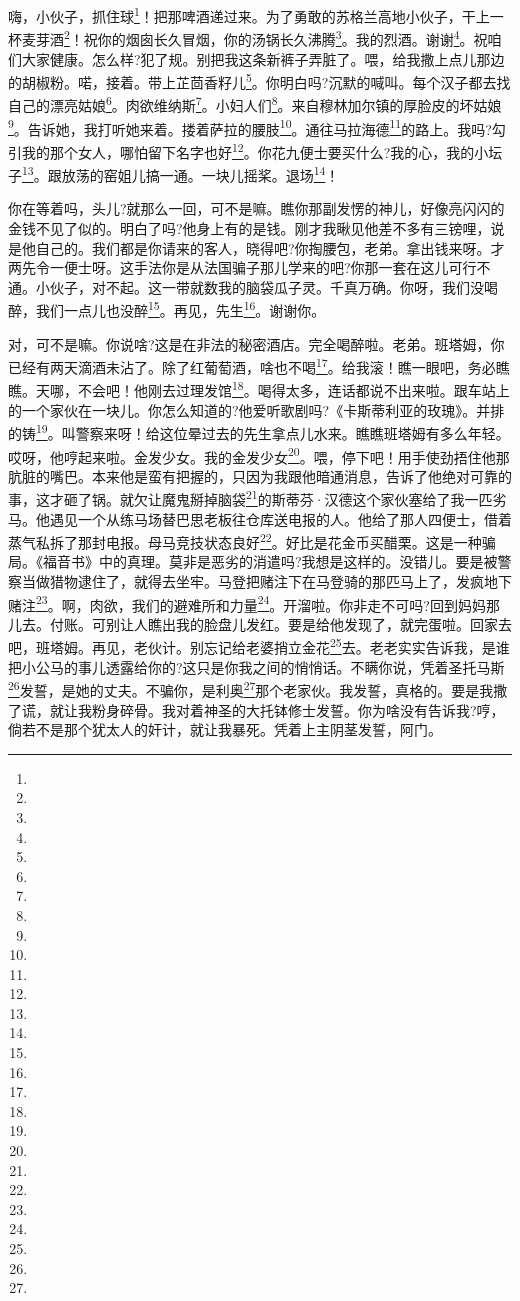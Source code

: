 \par 嗨，小伙子，抓住球\footnote{}！把那啤酒递过来。为了勇敢的苏格兰高地小伙子，干上一杯麦芽酒\footnote{}！祝你的烟囱长久冒烟，你的汤锅长久沸腾\footnote{}。我的烈酒。谢谢\footnote{}。祝咱们大家健康。怎么样?犯了规。别把我这条新裤子弄脏了。喂，给我撒上点儿那边的胡椒粉。喏，接着。带上芷茴香籽儿\footnote{}。你明白吗?沉默的喊叫。每个汉子都去找自己的漂亮姑娘\footnote{}。肉欲维纳斯\footnote{}。小妇人们\footnote{}。来自穆林加尔镇的厚脸皮的坏姑娘\footnote{}。告诉她，我打听她来着。搂着萨拉的腰肢\footnote{}。通往马拉海德\footnote{}的路上。我吗?勾引我的那个女人，哪怕留下名字也好\footnote{}。你花九便士要买什么?我的心，我的小坛子\footnote{}。跟放荡的窑姐儿搞一通。一块儿摇桨。退场\footnote{}！
\par 你在等着吗，头儿?就那么一回，可不是嘛。瞧你那副发愣的神儿，好像亮闪闪的金钱不见了似的。明白了吗?他身上有的是钱。刚才我瞅见他差不多有三镑哩，说是他自己的。我们都是你请来的客人，晓得吧?你掏腰包，老弟。拿出钱来呀。才两先令一便士呀。这手法你是从法国骗子那儿学来的吧?你那一套在这儿可行不通。小伙子，对不起。这一带就数我的脑袋瓜子灵。千真万确。你呀，我们没喝醉，我们一点儿也没醉\footnote{}。再见，先生\footnote{}。谢谢你。
\par 对，可不是嘛。你说啥?这是在非法的秘密酒店。完全喝醉啦。老弟。班塔姆，你已经有两天滴酒未沾了。除了红葡萄酒，啥也不喝\footnote{}。给我滚！瞧一眼吧，务必瞧瞧。天哪，不会吧！他刚去过理发馆\footnote{}。喝得太多，连话都说不出来啦。跟车站上的一个家伙在一块儿。你怎么知道的?他爱听歌剧吗?《卡斯蒂利亚的玫瑰》。并排的铸\footnote{}。叫警察来呀！给这位晕过去的先生拿点儿水来。瞧瞧班塔姆有多么年轻。哎呀，他哼起来啦。金发少女。我的金发少女\footnote{}。喂，停下吧！用手使劲捂住他那肮脏的嘴巴。本来他是蛮有把握的，只因为我跟他暗通消息，告诉了他绝对可靠的事，这才砸了锅。就欠让魔鬼掰掉脑袋\footnote{}的斯蒂芬·汉德这个家伙塞给了我一匹劣马。他遇见一个从练马场替巴思老板往仓库送电报的人。他给了那人四便士，借着蒸气私拆了那封电报。母马竞技状态良好\footnote{}。好比是花金币买醋栗。这是一种骗局。《福音书》中的真理。莫非是恶劣的消遣吗?我想是这样的。没错儿。要是被警察当做猎物逮住了，就得去坐牢。马登把赌注下在马登骑的那匹马上了，发疯地下赌注\footnote{}。啊，肉欲，我们的避难所和力量\footnote{}。开溜啦。你非走不可吗?回到妈妈那儿去。付账。可别让人瞧出我的脸盘儿发红。要是给他发现了，就完蛋啦。回家去吧，班塔姆。再见，老伙计。别忘记给老婆捎立金花\footnote{}去。老老实实告诉我，是谁把小公马的事儿透露给你的?这只是你我之间的悄悄话。不瞒你说，凭着圣托马斯\footnote{}发誓，是她的丈夫。不骗你，是利奥\footnote{}那个老家伙。我发誓，真格的。要是我撒了谎，就让我粉身碎骨。我对着神圣的大托钵修士发誓。你为啥没有告诉我?哼，倘若不是那个犹太人的奸计，就让我暴死。凭着上主阴茎发誓，阿门。
